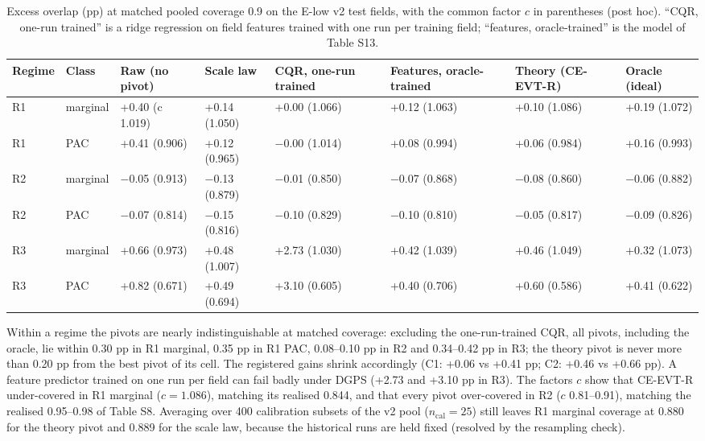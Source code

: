 \documentclass[preprint,12pt,authoryear]{elsarticle}
\begin{document}
\begin{table}[!htbp]
\centering
\scriptsize
\renewcommand{\thetable}{S11}\caption{Excess overlap (pp) at matched pooled coverage 0.9 on the E-low v2 test fields, with the common factor \(c\) in parentheses (post hoc). ``CQR, one-run trained'' is a ridge regression on field features trained with one run per training field; ``features, oracle-trained'' is the model of Table S13.}
\begin{adjustbox}{max width=\textwidth}
\begin{tabular}{@{}llll>{\raggedright\arraybackslash}p{7.0em}>{\raggedright\arraybackslash}p{7.0em}>{\raggedright\arraybackslash}p{7.0em}l@{}}
\toprule
\textbf{Regime} & \textbf{Class} & \textbf{Raw (no pivot)} & \textbf{Scale law} & \textbf{CQR, one-run trained} & \textbf{Features, oracle-trained} & \textbf{Theory (CE-EVT-R)} & \textbf{Oracle (ideal)} \\
\midrule
R1 & marginal & +0.40 (c 1.019) & +0.14 (1.050) & +0.00 (1.066) & +0.12 (1.063) & +0.10 (1.086) & +0.19 (1.072) \\
R1 & PAC & +0.41 (0.906) & +0.12 (0.965) & −0.00 (1.014) & +0.08 (0.994) & +0.06 (0.984) & +0.16 (0.993) \\
R2 & marginal & −0.05 (0.913) & −0.13 (0.879) & −0.01 (0.850) & −0.07 (0.868) & −0.08 (0.860) & −0.06 (0.882) \\
R2 & PAC & −0.07 (0.814) & −0.15 (0.816) & −0.10 (0.829) & −0.10 (0.810) & −0.05 (0.817) & −0.09 (0.826) \\
R3 & marginal & +0.66 (0.973) & +0.48 (1.007) & +2.73 (1.030) & +0.42 (1.039) & +0.46 (1.049) & +0.32 (1.073) \\
R3 & PAC & +0.82 (0.671) & +0.49 (0.694) & +3.10 (0.605) & +0.40 (0.706) & +0.60 (0.586) & +0.41 (0.622) \\
\bottomrule
\end{tabular}
\end{adjustbox}
\end{table}

Within a regime the pivots are nearly indistinguishable at matched coverage: excluding the one-run-trained CQR, all pivots, including the oracle, lie within 0.30 pp in R1 marginal, 0.35 pp in R1 PAC, 0.08--0.10 pp in R2 and 0.34--0.42 pp in R3; the theory pivot is never more than 0.20 pp from the best pivot of its cell. The registered gains shrink accordingly (C1: +0.06 vs +0.41 pp; C2: +0.46 vs +0.66 pp). A feature predictor trained on one run per field can fail badly under DGPS (+2.73 and +3.10 pp in R3). The factors \(c\) show that CE-EVT-R under-covered in R1 marginal (\(c=1.086\)), matching its realised 0.844, and that every pivot over-covered in R2 (\(c\) 0.81--0.91), matching the realised 0.95--0.98 of Table S8. Averaging over 400 calibration subsets of the v2 pool (\(n_\mathrm{cal}=25\)) still leaves R1 marginal coverage at 0.880 for the theory pivot and 0.889 for the scale law, because the historical runs are held fixed (resolved by the resampling check).
\end{document}
